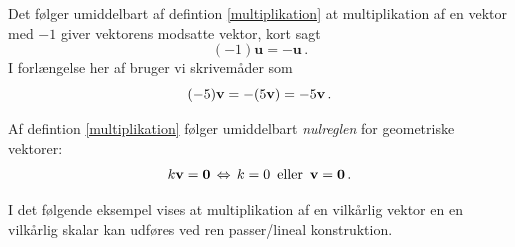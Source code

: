 \begin{aha}
Det følger umiddelbart af defintion \ref{multiplikation} at multiplikation af en vektor med $-1$ giver vektorens modsatte vektor, kort sagt $$(-1)\mathbf u=-\mathbf u\,.$$ I forlængelse her af bruger vi skrivemåder som $$ (-5)\mathbf{v}=-(5\mathbf{v})=-5\mathbf{v}\,.$$ 
\end{aha}

\begin{aha}
Af defintion \ref{multiplikation} følger umiddelbart \textit{nulreglen} for geometriske vektorer:
$$k\mathbf{v}=\bm{0}\,\Leftrightarrow\,k=0\,\,\,\mathrm{eller}\,\,\,\mathbf{v}=\bm{0}\,.$$
\end{aha}

I det følgende eksempel vises at multiplikation af en vilkårlig vektor en en vilkårlig skalar kan udføres ved ren passer/lineal konstruktion. %

